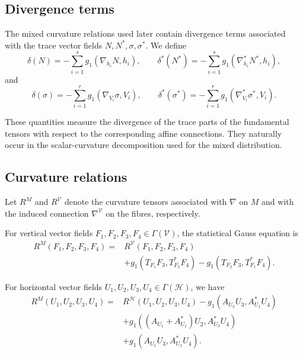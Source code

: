 \documentclass[10pt,a4paper]{article}
\theoremstyle{definition}
\theoremstyle{remark}
\numberwithin{equation}{section}
\begin{document}
\subsection{Divergence terms}

The mixed curvature relations used later contain divergence terms associated
with the trace vector fields $N,N^{*},\sigma,\sigma^{*}$. We define
\begin{equation}
\delta(N)
=
-\sum_{i=1}^{s}
g_1(\nabla_{h_i}N,h_i),
\qquad
\delta^{*}(N^{*})
=
-\sum_{i=1}^{s}
g_1(\nabla^{*}_{h_i}N^{*},h_i),
\label{eq-delta-N}
\end{equation}
and
\begin{equation}
\delta(\sigma)
=
-\sum_{i=1}^{r}
g_1(\nabla_{V_i}\sigma,V_i),
\qquad
\delta^{*}(\sigma^{*})
=
-\sum_{i=1}^{r}
g_1(\nabla^{*}_{V_i}\sigma^{*},V_i).
\label{eq-delta-sigma}
\end{equation}

These quantities measure the divergence of the trace parts of the
fundamental tensors with respect to the corresponding affine connections.
They naturally occur in the scalar-curvature decomposition used for the
mixed distribution.

\subsection{Curvature relations}

Let $R^{M}$ and $R^{\mathcal V}$ denote the curvature tensors associated
with $\nabla$ on $M$ and with the induced connection
$\nabla^{\mathcal V}$ on the fibres, respectively.

For vertical vector fields
$F_1,F_2,F_3,F_4\in\Gamma(\mathcal V)$, the statistical Gauss equation is
\begin{equation}
\begin{aligned}
R^{M}(F_1,F_2,F_3,F_4)
={}&
R^{\mathcal V}(F_1,F_2,F_3,F_4)\\
&+
g_1(T_{F_1}F_3,T^{*}_{F_2}F_4)
-
g_1(T_{F_2}F_3,T^{*}_{F_1}F_4).
\end{aligned}
\label{eq-Gauss-stat}
\end{equation}

For horizontal vector fields
$U_1,U_2,U_3,U_4\in\Gamma(\mathcal H)$, we have
\begin{align}
R^{M}(U_1,U_2,U_3,U_4)
={}&
R^{\mathcal H}(U_1,U_2,U_3,U_4)
-
g_1(A_{U_2}U_3,A^{*}_{U_1}U_4)
\nonumber\\
&+
g_1\left(
(A_{U_1}+A^{*}_{U_1})U_2,
A^{*}_{U_3}U_4
\right)
\nonumber\\
&+
g_1(A_{U_1}U_3,A^{*}_{U_2}U_4).
\label{eq-Gauss-hor}
\end{align}
\end{document}
